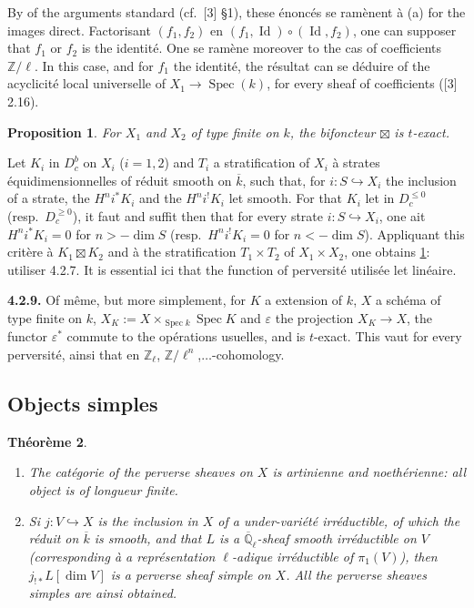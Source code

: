 \documentclass[12pt,a4paper]{article}
\theoremstyle{plain}
\newtheorem{theorem}{Th\'{e}or\`{e}me}[section]
\newtheorem{proposition}[theorem]{Proposition}
\theoremstyle{definition}
\DeclareMathOperator{\Id}{Id}
\DeclareMathOperator{\Spec}{Spec}
\newcommand{\into}{\hookrightarrow}
\providecommand{\Spec}{\operatorname{Spec}}
\begin{document}
{{By of the arguments standard (cf.\ [3] \S1), these \'{e}nonc\'{e}s se ram\`{e}nent \`{a} (a) for the images direct. Factorisant $(f_{1}, f_{2})$ en $(f_{1}, \Id) \circ (\Id, f_{2})$, one can supposer that $f_{1}$ or $f_{2}$ is the identit\'{e}. One se ram\`{e}ne moreover to the cas of coefficients $\mathbb{Z}/\ell$. In this case, and for $f_{1}$ the identit\'{e}, the r\'{e}sultat can se d\'{e}duire of the acyclicit\'{e} local universelle of $X_{1} \to \Spec(k)$, for every sheaf of coefficients ([3] 2.16).

\begin{proposition}\label{prop:4.2.8}
For $X_{1}$ and $X_{2}$ of type finite on $k$, the bifoncteur $\boxtimes$ is $t$-exact.
\end{proposition}

Let $K_{i}$ in $D_{c}^{b}$ on $X_{i}$ ($i=1,2$) and $T_{i}$ a stratification of $X_{i}$ \`{a} strates \'{e}quidimensionnelles of r\'{e}duit smooth on $\overline{k}$, such that, for $i: S \into X_{i}$ the inclusion of a strate, the $H^{n}i^{*}K_{i}$ and the $H^{n}i^{!}K_{i}$ let smooth. For that $K_{i}$ let in $D_{c}^{\leq 0}$ (resp.\ $D_{c}^{\geq 0}$), it faut and suffit then that for every strate $i: S \into X_{i}$, one ait $H^{n}i^{*}K_{i} = 0$ for $n > -\dim S$ (resp.\ $H^{n}i^{!}K_{i} = 0$ for $n < -\dim S$). Appliquant this crit\`{e}re \`{a} $K_{1} \boxtimes K_{2}$ and \`{a} the stratification $T_{1} \times T_{2}$ of $X_{1} \times X_{2}$, one obtains \ref{prop:4.2.8}: utiliser 4.2.7. It is essential ici that the function of perversit\'{e} utilis\'{e}e let lin\'{e}aire.

\noindent\textbf{4.2.9.} Of m\^{e}me, but more simplement, for $K$ a extension of $k$, $X$ a sch\'{e}ma of type finite on $k$, $X_{K} := X \times_{\Spec k} \Spec K$ and $\varepsilon$ the projection $X_{K} \to X$, the functor $\varepsilon^{*}$ commute to the op\'{e}rations usuelles, and is $t$-exact. This vaut for every perversit\'{e}, ainsi that en $\mathbb{Z}_{\ell}$, $\mathbb{Z}/\ell^{n}$,$\ldots$-cohomology.


\subsection{Objects simples}

\begin{theorem}\label{thm:4.3.1}
\begin{enumerate}
\item[(i)] The cat\'{e}gorie of the perverse sheaves on $X$ is artinienne and noeth\'{e}rienne: all object is of longueur finite.
\item[(ii)] Si $j: V \into X$ is the inclusion in $X$ of a under-vari\'{e}t\'{e} irr\'{e}ductible, of which the r\'{e}duit on $\overline{k}$ is smooth, and that $L$ is a $\overline{\mathbb{Q}}_{\ell}$-sheaf smooth irr\'{e}ductible on $V$ (corresponding \`{a} a repr\'{e}sentation $\ell$-adique irr\'{e}ductible of $\pi_{1}(V)$), then $j_{!*}L[\dim V]$ is a perverse sheaf simple on $X$. All the perverse sheaves simples are ainsi obtained.
\end{enumerate}
\end{theorem}

}}
\end{document}
